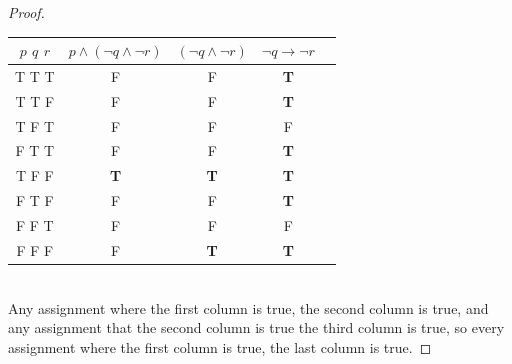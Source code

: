 \begin{exmp}
\begin{proof}
\begin{tabular}{ | c | c | c |c |c |} 
  \hline
 $p$ $q$ $r$ & $p \land (\lnot q \land \lnot r)$&$(\lnot q \land \lnot r)$&$\lnot q \to \lnot r$\\
 \hline
  T T T  &F &F&\textbf{T}\\
  T T F  &F &F&\textbf{T}\\
  T F T  &F &F&F\\
  F T T  &F &F&\textbf{T}\\
  T F F  &\textbf{T} &\textbf{T}&\textbf{T}\\ 
  F T F  &F &F&\textbf{T}\\ 
  F F T  &F &F&F\\ 
  F F F  &F &\textbf{T}&\textbf{T}\\ 
 \hline
\end{tabular}\\
Any assignment where the first column is true, the second column is true, and any assignment that the second column is true the third column is true, so every assignment where the first column is true, the last column is true.
\end{proof}
\end{exmp}

\newpage

